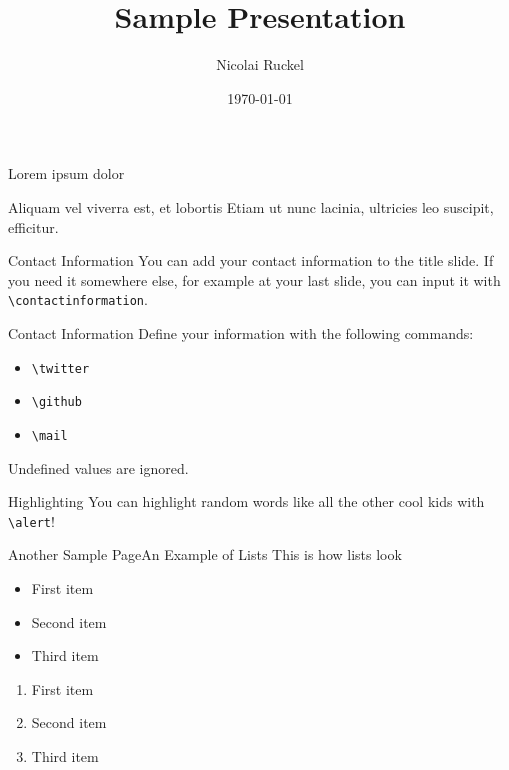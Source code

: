 \documentclass[17pt,aspectratio=169]{beamer}
\title{Sample Presentation}
\author{Nicolai Ruckel}
\date{\today}
\begin{document}
\begin{frame}
  \titlepage%
\end{frame}

\begin{frame}{}{}
  \Huge Lorem ipsum dolor\par
  \Large Aliquam vel viverra est, et lobortis
  \vfill
  \flushright
  \normalsize Etiam ut nunc lacinia, ultricies leo suscipit, efficitur.
\end{frame}

\begin{frame}{Contact Information}{}
  You can add your contact information to the title slide. If you need it
  somewhere else, for example at your last slide, you can input it with
  \texttt{\textbackslash contactinformation}.
\end{frame}

\begin{frame}{Contact Information}{}
  Define your information with the following commands:
  \begin{itemize}
    \item \texttt{\textbackslash twitter}
    \item \texttt{\textbackslash github}
    \item \texttt{\textbackslash mail}
  \end{itemize}
  Undefined values are ignored.
\end{frame}

\begin{frame}{Highlighting}{}
  \Large
  You can \alert{highlight} random words like \alert{all} the other cool kids
  with \texttt{\textbackslash alert}!
  \vfill%
\end{frame}

\begin{frame}{Another Sample Page}{An Example of Lists}
  This is how lists look
  \begin{itemize}
    \item First item
    \item Second item
    \item Third item
  \end{itemize}
  \begin{enumerate}
    \item First item
    \item Second item
    \item Third item
  \end{enumerate}
\end{frame}
\end{document}
